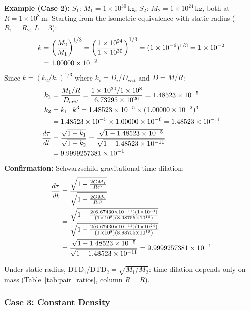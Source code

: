 \documentclass[twoside,twocolumn,9pt]{article}
\begin{document}
\begin{mdframed}
\textbf{Example (Case 2):} $S_1$: $M_1 = 1 \times 10^{30}$\,kg, $S_2$: $M_2 = 1 \times 10^{24}$\,kg, both at $R = 1 \times 10^{8}$\,m. Starting from the isometric equivalence with static radius ($R_1 = R_2$, $L = 3$):
\begin{align}
k &= \left(\frac{M_2}{M_1}\right)^{1/3}
= \left(\frac{1 \times 10^{24}}{1 \times 10^{30}}\right)^{1/3}
= (1 \times 10^{-6})^{1/3}
= 1 \times 10^{-2} \notag \\
&= 1.00000 \times 10^{-2} \notag
\end{align}
Since $k = (k_2/k_1)^{1/3}$ where $k_i = D_i/D_{crit}$ and $D = M/R$:
\begin{align}
k_1 &= \frac{M_1/R}{D_{crit}}
= \frac{1 \times 10^{30}/1 \times 10^{8}}{6.73295 \times 10^{26}}
= 1.48523 \times 10^{-5} \notag \\
k_2 &= k_1 \cdot k^3
= 1.48523 \times 10^{-5} \times (1.00000 \times 10^{-2})^3 \notag \\
&= 1.48523 \times 10^{-5} \times 1.00000 \times 10^{-6}
= 1.48523 \times 10^{-11} \notag \\
\frac{d\tau}{dt}
&= \frac{\sqrt{1 - k_1}}{\sqrt{1 - k_2}}
= \frac{\sqrt{1 - 1.48523 \times 10^{-5}}}{\sqrt{1 - 1.48523 \times 10^{-11}}} \notag \\
&= 9.9999257381 \times 10^{-1} \notag
\end{align}
\textbf{Confirmation:} Schwarzschild gravitational time dilation:
\begin{align}
\frac{d\tau}{dt}
&= \frac{\sqrt{1 - \frac{2GM_1}{Rc^2}}}{\sqrt{1 - \frac{2GM_2}{Rc^2}}} \notag \\
&= \frac{\sqrt{1 - \frac{2(6.67430 \times 10^{-11})(1 \times 10^{30})}{(1 \times 10^{8})(8.98755 \times 10^{16})}}}{\sqrt{1 - \frac{2(6.67430 \times 10^{-11})(1 \times 10^{24})}{(1 \times 10^{8})(8.98755 \times 10^{16})}}} \notag \\
&= \frac{\sqrt{1 - 1.48523 \times 10^{-5}}}{\sqrt{1 - 1.48523 \times 10^{-11}}}
= 9.9999257381 \times 10^{-1} \notag
\end{align}
\end{mdframed}

\noindent Under static radius, $\text{DTD}_1/\text{DTD}_2 = \sqrt{M_1/M_2}$: time dilation depends only on mass (Table~\ref{tab:pair_ratios}, column $R = R$).

\subsubsection*{Case 3: Constant Density}
\end{document}
